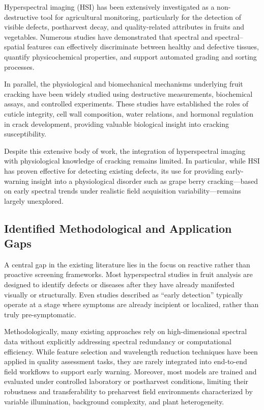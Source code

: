 \noindent
Hyperspectral imaging (HSI) has been extensively investigated as a non-destructive tool
for agricultural monitoring, particularly for the detection of visible defects, postharvest
decay, and quality-related attributes in fruits and vegetables. Numerous studies have
demonstrated that spectral and spectral--spatial features can effectively discriminate
between healthy and defective tissues, quantify physicochemical properties, and support
automated grading and sorting processes.

\medskip
\noindent
In parallel, the physiological and biomechanical mechanisms underlying fruit cracking
have been widely studied using destructive measurements, biochemical assays, and
controlled experiments. These studies have established the roles of cuticle integrity,
cell wall composition, water relations, and hormonal regulation in crack development,
providing valuable biological insight into cracking susceptibility.

Despite this extensive body of work, the integration of hyperspectral imaging with
physiological knowledge of cracking remains limited. In particular, while HSI has proven
effective for detecting existing defects, its use for providing early-warning insight into
a physiological disorder such as grape berry cracking—based on early spectral trends
under realistic field acquisition variability—remains largely unexplored.

\subsection{Identified Methodological and Application Gaps}
\label{subsec:gap_methods}

\noindent
A central gap in the existing literature lies in the focus on reactive rather than proactive
screening frameworks. Most hyperspectral studies in fruit analysis are designed to identify defects
or diseases after they have already manifested visually or structurally. Even studies
described as ``early detection'' typically operate at a stage where symptoms are already
incipient or localized, rather than truly pre-symptomatic.

\medskip
\noindent
Methodologically, many existing approaches rely on high-dimensional spectral data
without explicitly addressing spectral redundancy or computational efficiency. While
feature selection and wavelength reduction techniques have been applied in quality
assessment tasks, they are rarely integrated into end-to-end field workflows to support early
warning. Moreover, most models are trained and evaluated under controlled laboratory
or postharvest conditions, limiting their robustness and transferability to preharvest field
environments characterized by variable illumination, background complexity, and plant
heterogeneity.



